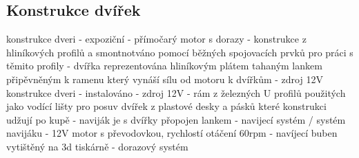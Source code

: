 
\subsection{Konstrukce dvířek}\label{subsec:konstrukce-dvirek}
konstrukce dveri - expoziční
- přímočarý motor s dorazy
- konstrukce z hliníkových profilů a smontnotváno pomocí běžných spojovacích prvků pro práci s těmito profily
- dvířka reprezentována hliníkovým plátem tahaným lankem připěvněným k ramenu který vynáší sílu od motoru k dvířkům
- zdroj 12V
konstrukce dveri - instalováno
- zdroj 12V
- rám z železných U profilů použitých jako vodící lišty pro posuv dvířek z plastové desky a pásků které konstrukci udžují po kupě
- naviják je s dvířky přopojen lankem
- navijecí systém / systém navijáku
- 12V motor s převodovkou, rychlostí otáčení 60rpm
- navíjecí buben vytištěný na 3d tiskárně
- dorazový systém